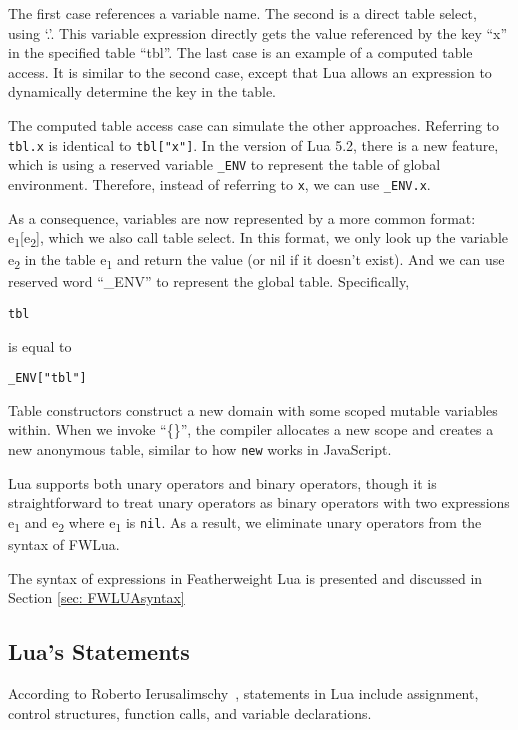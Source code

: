 The first case references a variable name.
The second is a direct table select, using `.'.
This variable expression directly gets the value referenced by the key ``x'' in the specified table ``tbl''.
The last case is an example of a computed table access.
It is similar to the second case, except that Lua allows an expression to dynamically determine the key in the table.

The computed table access case can simulate the other approaches.
Referring to {\tt tbl.x} is identical to {\tt tbl["x"]}.
In the version of Lua 5.2, there is a new feature, which is using a reserved variable {\tt \_ENV} to represent the table of global environment.
Therefore, instead of referring to {\tt x}, we can use {\tt \_ENV.x}.

As a consequence, variables are now represented by a more common format: e\textsubscript{1}[e\textsubscript{2}], which we also call table select. In this format, we only look up the variable e\textsubscript{2} in the table e\textsubscript{1} and return the value (or nil if it doesn't exist). And we can use reserved word ``\_ENV'' to represent the global table. Specifically,

\begin{verbatim}
tbl
\end{verbatim}
is equal to
\begin{verbatim}
_ENV["tbl"]
\end{verbatim}

Table constructors
construct a new domain with some scoped mutable variables within.
When we invoke ``\{\}'', the compiler allocates a new scope
and creates a new anonymous table, similar to how {\tt new} works in JavaScript.

Lua supports both
unary operators and binary operators, though it is straightforward to treat unary operators as binary operators
with two expressions e\textsubscript{1} and e\textsubscript{2} where e\textsubscript{1} is {\tt nil}.
As a result, we eliminate unary operators from the syntax of FWLua.

The syntax of expressions in Featherweight Lua is presented and discussed in Section \ref{sec: FWLUAsyntax}

\subsection{Lua's Statements}
According to Roberto Ierusalimschy~\cite{PIL},
statements in Lua include assignment, control structures, function calls, and variable declarations.

